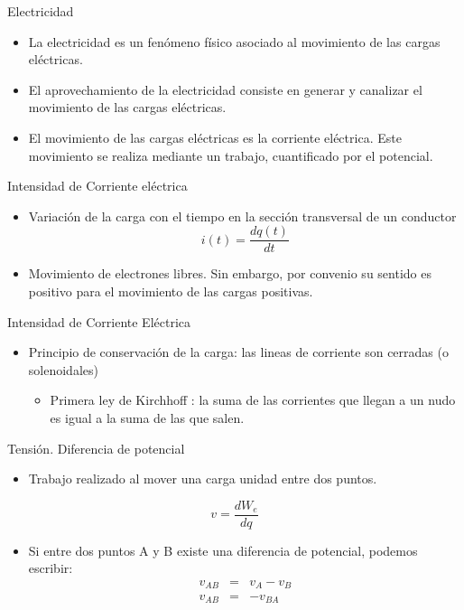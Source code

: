 \documentclass[xcolor={usenames,svgnames,dvipsnames}]{beamer}
\begin{document}
\begin{frame}[label={sec:org8a0378b}]{Electricidad}
\begin{itemize}
\item La electricidad es un fenómeno físico asociado al \alert{movimiento de las
cargas eléctricas}.

\item El aprovechamiento de la electricidad consiste en generar y canalizar
el movimiento de las cargas eléctricas.

\item El movimiento de las cargas eléctricas es la \alert{corriente eléctrica}.
Este movimiento se realiza mediante un trabajo, cuantificado por el
\alert{potencial}.
\end{itemize}
\end{frame}

\begin{frame}[label={sec:orgd0188bd}]{Intensidad de Corriente eléctrica}
\begin{itemize}
\item \alert{Variación de la carga con el tiempo en la sección transversal de un
conductor} $$i(t)=\frac{dq(t)}{dt}$$

\item Movimiento de electrones libres. Sin embargo, por convenio su sentido
es positivo para el movimiento de las cargas positivas.
\end{itemize}
\end{frame}

\begin{frame}[label={sec:org9c2c4f8}]{Intensidad de Corriente Eléctrica}
\begin{itemize}
\item \alert{Principio de conservación de la carga}: las lineas de corriente son
cerradas (o solenoidales)

\begin{itemize}
\item Primera ley de Kirchhoff : la suma de las corrientes que llegan a
un nudo es igual a la suma de las que salen.
\end{itemize}
\end{itemize}
\end{frame}

\begin{frame}[label={sec:orgb518658}]{Tensión. Diferencia de potencial}
\begin{itemize}
\item \alert{Trabajo realizado al mover una carga unidad entre dos puntos}.
\end{itemize}

$$v=\frac{dW_{e}}{dq}$$

\begin{itemize}
\item Si entre dos puntos A y B existe una diferencia de potencial, podemos
escribir: $$\begin{aligned}
         v_{AB} & = & v_{A}-v_{B}\\
         v_{AB} & = & -v_{BA}
       \end{aligned}$$
\end{itemize}
\end{frame}
\end{document}

